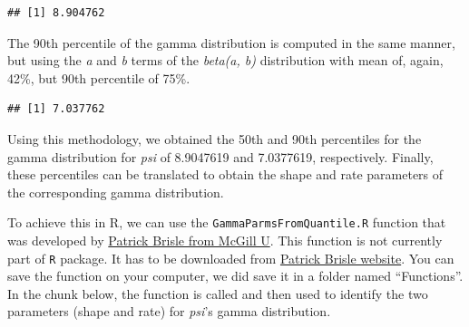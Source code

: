 \documentclass[
]{book}
\newenvironment{Shaded}{\begin{snugshade}}{\end{snugshade}}
\newcommand{\AttributeTok}[1]{\textcolor[rgb]{0.13,0.29,0.53}{#1}}
\newcommand{\CommentTok}[1]{\textcolor[rgb]{0.56,0.35,0.01}{\textit{#1}}}
\newcommand{\FloatTok}[1]{\textcolor[rgb]{0.00,0.00,0.81}{#1}}
\newcommand{\FunctionTok}[1]{\textcolor[rgb]{0.13,0.29,0.53}{\textbf{#1}}}
\newcommand{\NormalTok}[1]{#1}
\newcommand{\OtherTok}[1]{\textcolor[rgb]{0.56,0.35,0.01}{#1}}
\newcommand{\SpecialCharTok}[1]{\textcolor[rgb]{0.81,0.36,0.00}{\textbf{#1}}}
\newcommand{\StringTok}[1]{\textcolor[rgb]{0.31,0.60,0.02}{#1}}
\begin{document}
\begin{verbatim}
## [1] 8.904762
\end{verbatim}

The 90th percentile of the gamma distribution is computed in the same manner, but using the \emph{a} and \emph{b} terms of the \emph{beta(a, b)} distribution with mean of, again, 42\%, but 90th percentile of 75\%.

\begin{Shaded}
\end{Shaded}

\begin{verbatim}
## [1] 7.037762
\end{verbatim}

Using this methodology, we obtained the 50th and 90th percentiles for the gamma distribution for \emph{psi} of 8.9047619 and 7.0377619, respectively. Finally, these percentiles can be translated to obtain the shape and rate parameters of the corresponding gamma distribution.

To achieve this in R, we can use the \texttt{GammaParmsFromQuantile.R} function that was developed by \href{https://www.medicine.mcgill.ca/epidemiology/Joseph/PBelisle/GammaParmsFromQuantiles.html\#download}{Patrick Brisle from McGill U}. This function is not currently part of \texttt{R} package. It has to be downloaded from \href{https://www.medicine.mcgill.ca/epidemiology/Joseph/PBelisle/GammaParmsFromQuantiles.html\#download}{Patrick Brisle website}. You can save the function on your computer, we did save it in a folder named ``Functions''. In the chunk below, the function is called and then used to identify the two parameters (shape and rate) for \emph{psi}'s gamma distribution.
\end{document}
